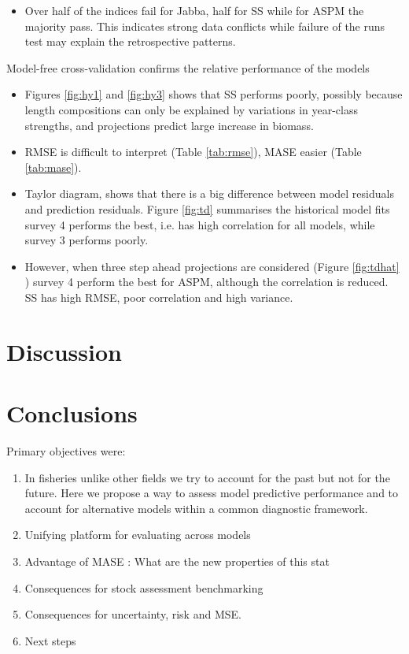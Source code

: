 \documentclass[a4paper]{article}
\begin{document}
\begin{description}
\begin{itemize}
        \item Over half of the indices fail for Jabba, half for SS while for ASPM the majority pass. This indicates strong data conflicts while  failure of the runs test may explain the retrospective patterns.
   \end{itemize}
     \item{Model-free cross-validation} confirms the relative performance of the models
    \begin{itemize}
        \item Figures \ref{fig:hy1} and \ref{fig:hy3} shows that SS performs poorly, possibly because length compositions can only be explained by variations in year-class strengths, and projections predict large increase in biomass.
        \item RMSE is difficult to interpret (Table \ref{tab:rmse}), MASE easier (Table \ref{tab:mase}).
        \item Taylor diagram, shows that there is a big difference between model residuals and prediction residuals. Figure \ref{fig:td} summarises the historical model fits survey 4 performs the best, i.e. has high correlation for all models, while survey 3 performs poorly.
        \item However, when three step ahead projections are considered (Figure \ref{fig:tdhat} ) survey 4 perform the best for ASPM, although the correlation is reduced. SS has high RMSE, poor correlation and high  variance.  
   \end{itemize}
 \end{description}

\section{Discussion}


\section{Conclusions}

Primary objectives were:
\begin{enumerate}
    \item In fisheries unlike other fields we try to account for the past but not for the future. Here we propose a way to assess model predictive performance and to account for alternative models within a common diagnostic framework.  
    \item Unifying platform for evaluating across models
    \item Advantage of MASE : What are the new properties of this stat
    \item Consequences for stock assessment benchmarking
    \item Consequences for uncertainty, risk and MSE.
    \item Next steps
\end{enumerate}
\end{document}
